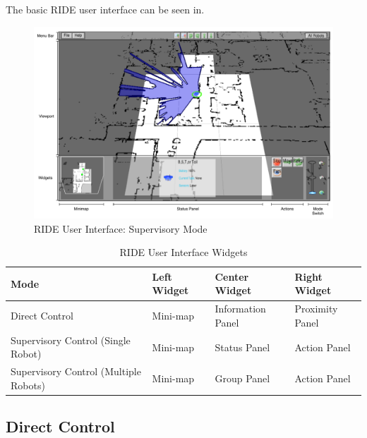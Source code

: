 The basic RIDE user interface can be seen in.
\begin{figure}[ht]
\begin{center}
\includegraphics[width=6.10in]{images/ride-ui.pdf}
\caption{RIDE User Interface: Supervisory Mode\label{fig:ride-ui}}
\end{center}
\end{figure}


\begin{table}[ht]
\label{tab:ui-widgets}
\begin{center}
    \begin{tabular}{ | p{4cm} | l | l | l |}
    \hline
    \textbf{Mode} & \textbf{Left Widget} & \textbf{Center Widget} & \textbf{Right Widget} \\ \hline
    Direct Control & Mini-map & Information Panel & Proximity Panel \\ \hline
    Supervisory Control (Single Robot) & Mini-map & Status Panel & Action Panel \\ \hline
    Supervisory Control (Multiple Robots) & Mini-map & Group Panel & Action Panel \\ \hline
    \hline
    \end{tabular}
    \caption{RIDE User Interface Widgets}
\end{center}
\end{table}

\subsection{Direct Control}


